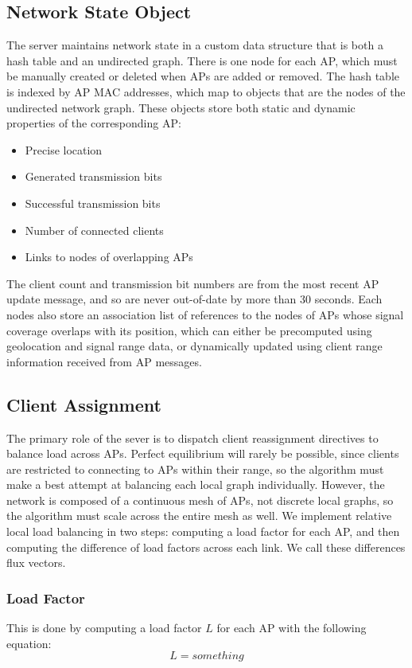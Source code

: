 \documentclass[10pt,journal,compsoc]{IEEEtran}
\begin{document}
		\subsection{Network State Object}
		The server maintains network state in a custom data structure that is both a hash table and an undirected graph. There is one node for each AP, which must be manually created or deleted when APs are added or removed. The hash table is indexed by AP MAC addresses, which map to objects that are the nodes of the undirected network graph. These objects store both static and dynamic properties of the corresponding AP:
		\begin{itemize}
			\item Precise location
			\item Generated transmission bits
			\item Successful transmission bits
			\item Number of connected clients
			\item Links to nodes of overlapping APs
		\end{itemize}
		The client count and transmission bit numbers are from the most recent AP update message, and so are never out-of-date by more than 30 seconds. Each nodes also store an association list of references to the nodes of APs whose signal coverage overlaps with its position, which can either be precomputed using geolocation and signal range data, or dynamically updated using client range information received from AP messages.
		
		\subsection{Client Assignment}
		The primary role of the sever is to dispatch client reassignment directives to balance load across APs. Perfect equilibrium will rarely be possible, since clients are restricted to connecting to APs within their range, so the algorithm must make a best attempt at balancing each local graph individually. However, the network is composed of a continuous mesh of APs, not discrete local graphs, so the algorithm must scale across the entire mesh as well. We implement relative local load balancing in two steps: computing a load factor for each AP, and then computing the difference of load factors across each link. We call these differences flux vectors.
		
		\subsubsection{Load Factor}
		This is done by computing a load factor \(L\) for each AP with the following equation:
		\[L = something\]
		
\end{document}
